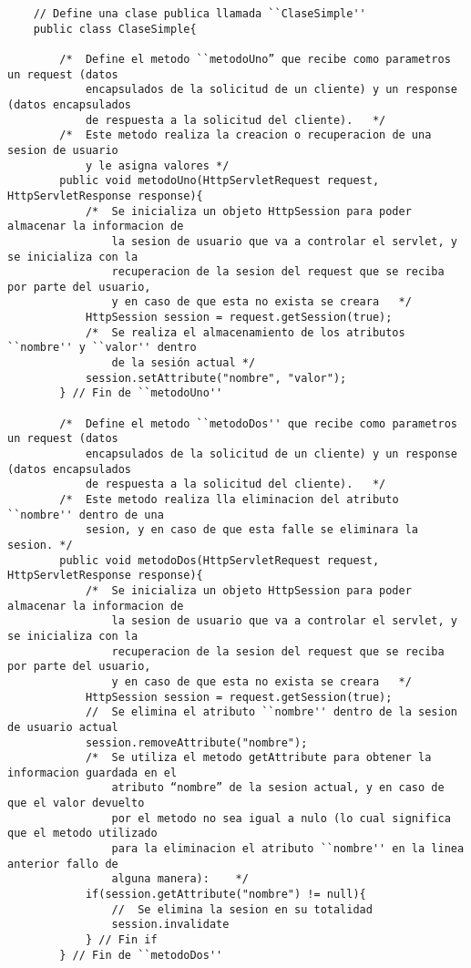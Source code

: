 \documentclass[10pt,a4paper]{article} %
\begin{document}
\begin{lstlisting}
    // Define una clase publica llamada ``ClaseSimple''
	public class ClaseSimple{
	    
	    /*  Define el metodo ``metodoUno” que recibe como parametros un request (datos
    	    encapsulados de la solicitud de un cliente) y un response (datos encapsulados
	        de respuesta a la solicitud del cliente).   */
        /*  Este metodo realiza la creacion o recuperacion de una sesion de usuario 
            y le asigna valores */
	    public void metodoUno(HttpServletRequest request, HttpServletResponse response){
	        /*  Se inicializa un objeto HttpSession para poder almacenar la informacion de 
	            la sesion de usuario que va a controlar el servlet, y se inicializa con la 
	            recuperacion de la sesion del request que se reciba por parte del usuario, 
	            y en caso de que esta no exista se creara   */
	        HttpSession session = request.getSession(true);
	        /*  Se realiza el almacenamiento de los atributos ``nombre'' y ``valor'' dentro 
	            de la sesión actual */
	        session.setAttribute("nombre", "valor");
	    } // Fin de ``metodoUno''
	    
	    /*  Define el metodo ``metodoDos'' que recibe como parametros un request (datos
    	    encapsulados de la solicitud de un cliente) y un response (datos encapsulados
	        de respuesta a la solicitud del cliente).   */
	    /*  Este metodo realiza lla eliminacion del atributo ``nombre'' dentro de una 
	        sesion, y en caso de que esta falle se eliminara la sesion. */
	    public void metodoDos(HttpServletRequest request, HttpServletResponse response){
	        /*  Se inicializa un objeto HttpSession para poder almacenar la informacion de 
	            la sesion de usuario que va a controlar el servlet, y se inicializa con la 
	            recuperacion de la sesion del request que se reciba por parte del usuario, 
	            y en caso de que esta no exista se creara   */
	        HttpSession session = request.getSession(true);
	        //  Se elimina el atributo ``nombre'' dentro de la sesion de usuario actual 
	        session.removeAttribute("nombre");
	        /*  Se utiliza el metodo getAttribute para obtener la informacion guardada en el
	            atributo “nombre” de la sesion actual, y en caso de que el valor devuelto 
	            por el metodo no sea igual a nulo (lo cual significa que el metodo utilizado 
	            para la eliminacion el atributo ``nombre'' en la linea anterior fallo de 
	            alguna manera):    */
	        if(session.getAttribute("nombre") != null){
	            //  Se elimina la sesion en su totalidad
	            session.invalidate
	        } // Fin if
	    } // Fin de ``metodoDos''
	    

\end{lstlisting}
\end{document}
